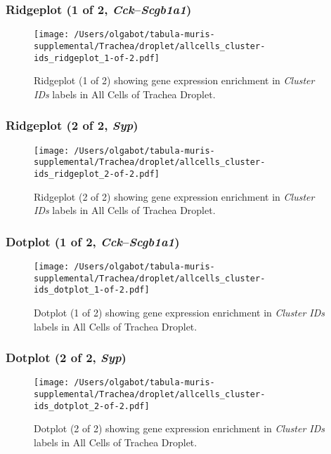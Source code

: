 \clearpage

\subsubsection{Ridgeplot (1 of 2, \emph{Cck}--\emph{Scgb1a1})}
\begin{figure}[h]
\centering
\texttt{[image: /Users/olgabot/tabula-muris-supplemental/Trachea/droplet/allcells\_cluster-ids\_ridgeplot\_1-of-2.pdf]}

\caption{ Ridgeplot (1 of 2)  showing gene expression enrichment in \emph{Cluster IDs} labels in All Cells of Trachea Droplet. }
\end{figure}


\clearpage

\subsubsection{Ridgeplot (2 of 2, \emph{Syp})}
\begin{figure}[h]
\centering
\texttt{[image: /Users/olgabot/tabula-muris-supplemental/Trachea/droplet/allcells\_cluster-ids\_ridgeplot\_2-of-2.pdf]}

\caption{ Ridgeplot (2 of 2)  showing gene expression enrichment in \emph{Cluster IDs} labels in All Cells of Trachea Droplet. }
\end{figure}


\clearpage

\subsubsection{Dotplot (1 of 2, \emph{Cck}--\emph{Scgb1a1})}
\begin{figure}[h]
\centering
\texttt{[image: /Users/olgabot/tabula-muris-supplemental/Trachea/droplet/allcells\_cluster-ids\_dotplot\_1-of-2.pdf]}

\caption{ Dotplot (1 of 2)  showing gene expression enrichment in \emph{Cluster IDs} labels in All Cells of Trachea Droplet. }
\end{figure}


\clearpage

\subsubsection{Dotplot (2 of 2, \emph{Syp})}
\begin{figure}[h]
\centering
\texttt{[image: /Users/olgabot/tabula-muris-supplemental/Trachea/droplet/allcells\_cluster-ids\_dotplot\_2-of-2.pdf]}

\caption{ Dotplot (2 of 2)  showing gene expression enrichment in \emph{Cluster IDs} labels in All Cells of Trachea Droplet. }
\end{figure}


